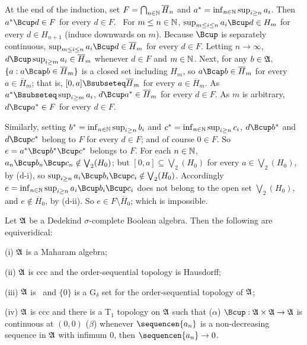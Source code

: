 { At the end of the induction, set
$F=\bigcap_{n\in\Bbb N}\overline{H}_n$ and
$a^*=\inf_{n\in\Bbb N}\sup_{i\ge n}a_i$.   Then $a^*\Bcup d\in F$ for every
$d\in F$.   \Prf\ For $m\le n\in\Bbb N$,
$\sup_{m\le i\le n}a_i\Bcup d\in H_m$ for every $d\in H_{n+1}$ (induce
downwards on $m$).   Because $\Bcup$ is separately continuous,
$\sup_{m\le i\le n}a_i\Bcup d\in\overline{H}_m$ for
every $d\in F$.   Letting $n\to\infty$,
$d\Bcup\sup_{i\ge m}a_i\in\overline{H}_m$ whenever $d\in F$ and
$m\in\Bbb N$.
Next, for any $b\in\frak A$, $\{a:a\Bcap b\in\overline{H}_m\}$ is a closed
set including $H_m$, so $a\Bcap b\in\overline{H}_m$ for every
$a\in\overline{H}_m$;  that is, $[0,a]\Bsubseteq\overline{H}_m$ for every
$a\in\overline{H}_m$.   As $a^*\Bsubseteq\sup_{i\ge m}a_i$,
$d\Bcup a^*\in\overline{H}_m$ for every
$d\in F$.   As $m$ is arbitrary, $d\Bcup a^*\in F$ for
every $d\in F$.\ \Qed

Similarly, setting $b^*=\inf_{n\in\Bbb N}\sup_{i\ge n}b_i$ and
$c^*=\inf_{n\in\Bbb N}\sup_{i\ge n}c_i$, $d\Bcup b^*$ and $d\Bcup c^*$
belong to $F$ for every $d\in F$;  and of course $0\in F$.
So $e=a^*\Bcup b^*\Bcup c^*$ belongs to
$F$.   For each $n\in\Bbb N$, $a_n\Bcup b_n\Bcup c_n\notin\bigvee_2(H_0)$;
but $[0,a]\subseteq\bigvee_2(H_0)$ for every $a\in\bigvee_2(H_0)$,
by (d-i),
so $\sup_{i\ge n}a_i\Bcup b_i\Bcup c_i\notin\bigvee_2(H_0)$.
Accordingly $e=\inf_{n\in\Bbb N}\sup_{i\ge n}a_i\Bcup b_i\Bcup c_i$
does not belong to the open set $\bigvee_2(H_0)$, and
$e\notin\overline{H}_0$, by (d-ii).
So $e\in F\setminus\overline{H}_0$;  which is impossible.\ \Bang
}%

 Let
$\frak A$ be a Dedekind $\sigma$-complete Boolean algebra.
Then the following are equiveridical:

(i) $\frak A$ is a Maharam algebra;

(ii) $\frak A$ is ccc and the order-sequential topology is Hausdorff;

(iii) $\frak A$ is \wsid\ and
$\{0\}$ is a G$_{\delta}$ set for the order-sequential
topology of $\frak A$;

(iv) $\frak A$ is ccc and there is a T$_1$ topology on $\frak A$
such that ($\alpha$) $\Bcup:\frak A\times\frak A\to\frak A$ is
continuous at $(0,0)$ ($\beta$) whenever $\sequencen{a_n}$ is a
non-decreasing
sequence in $\frak A$ with infimum $0$, then $\sequencen{a_n}\to 0$.

